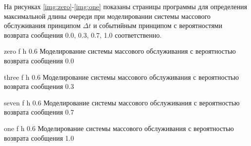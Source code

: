 На рисунках \ref{img:zero}-\ref{img:one} показаны страницы программы для определения максимальной длины очереди при моделировании системы массового обслуживания принципом $\Delta t$ и событийным принципом с вероятностями возврата сообщения 0.0, 0.3, 0.7, 1.0 соответственно.

    {zero}
    {f}
    {h}
    {0.6\textwidth}
    {Моделирование системы массового обслуживания с вероятностью возврата сообщения 0.0}
    
    {three}
    {f}
    {h}
    {0.6\textwidth}
    {Моделирование системы массового обслуживания с вероятностью возврата сообщения 0.3}
    
    {seven}
    {f}
    {h}
    {0.6\textwidth}
    {Моделирование системы массового обслуживания с вероятностью возврата сообщения 0.7}
    
    {one}
    {f}
    {h}
    {0.6\textwidth}
    {Моделирование системы массового обслуживания с вероятностью возврата сообщения 1.0}

